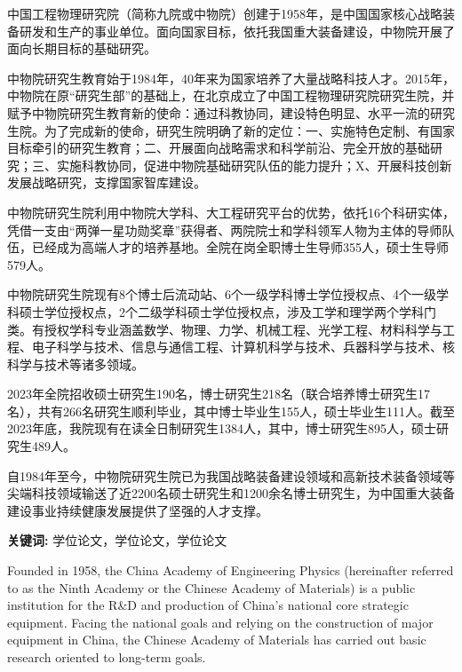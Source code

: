 
\setcounter{page}{1}
\song{}
中国工程物理研究院（简称九院或中物院）创建于1958年，是中国国家核心战略装备研发和生产的事业单位。面向国家目标，依托我国重大装备建设，中物院开展了面向长期目标的基础研究。

中物院研究生教育始于1984年，40年来为国家培养了大量战略科技人才。2015年，中物院在原“研究生部”的基础上，在北京成立了中国工程物理研究院研究生院，并赋予中物院研究生教育新的使命：通过科教协同，建设特色明显、水平一流的研究生院。为了完成新的使命，研究生院明确了新的定位：一、实施特色定制、有国家目标牵引的研究生教育；二、开展面向战略需求和科学前沿、完全开放的基础研究；三、实施科教协同，促进中物院基础研究队伍的能力提升；X、开展科技创新发展战略研究，支撑国家智库建设。

中物院研究生院利用中物院大学科、大工程研究平台的优势，依托16个科研实体，凭借一支由“两弹一星功勋奖章”获得者、两院院士和学科领军人物为主体的导师队伍，已经成为高端人才的培养基地。全院在岗全职博士生导师355人，硕士生导师579人。

中物院研究生院现有8个博士后流动站、6个一级学科博士学位授权点、4个一级学科硕士学位授权点，2个二级学科硕士学位授权点，涉及工学和理学两个学科门类。有授权学科专业涵盖数学、物理、力学、机械工程、光学工程、材料科学与工程、电子科学与技术、信息与通信工程、计算机科学与技术、兵器科学与技术、核科学与技术等诸多领域。

2023年全院招收硕士研究生190名，博士研究生218名（联合培养博士研究生17名），共有266名研究生顺利毕业，其中博士毕业生155人，硕士毕业生111人。截至2023年底，我院现有在读全日制研究生1384人，其中，博士研究生895人，硕士研究生489人。

自1984年至今，中物院研究生院已为我国战略装备建设领域和高新技术装备领域等尖端科技领域输送了近2200名硕士研究生和1200余名博士研究生，为中国重大装备建设事业持续健康发展提供了坚强的人才支撑。

\vspace{\baselineskip}

\hangindent=52.3pt\noindent
{\bfseries\xiaosi\song 关键词:} 学位论文，学位论文，学位论文
\clearpage


Founded in 1958, the China Academy of Engineering Physics (hereinafter referred to as the Ninth Academy or the Chinese Academy of Materials) is a public institution for the R&D and production of China's national core strategic equipment. Facing the national goals and relying on the construction of major equipment in China, the Chinese Academy of Materials has carried out basic research oriented to long-term goals.

